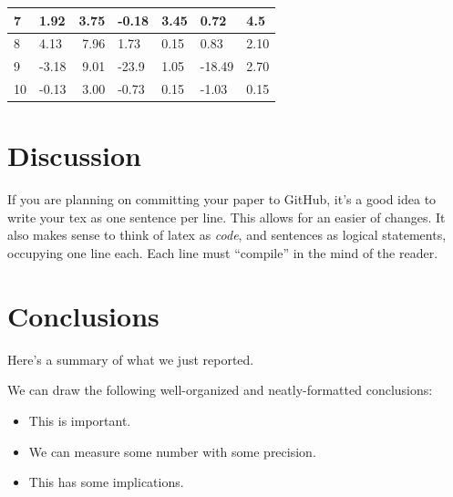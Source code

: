 \documentclass[\docopts]{\docclass}
\begin{document}
\begin{table}[]
\begin{tabular}{|l|l|r|l|l|l|l|}
7                                           & 1.92                   & 3.75                                                 & -0.18                   & 3.45                            & 0.72                    & 4.5                             \\ \hline
8                                           & 4.13                   & 7.96                                                 & 1.73                    & 0.15                            & 0.83                    & 2.10                            \\ \hline
9                                           & -3.18                  & 9.01                                                 & -23.9                   & 1.05                            & -18.49                  & 2.70                            \\ \hline
10                                          & -0.13                  & 3.00                                                 & -0.73                   & 0.15                            & -1.03                   & 0.15                            \\ \hline
\end{tabular}
\end{table}

\section{Discussion}
\label{sec:discussion}

If you are planning on committing your paper to GitHub, it's a good idea to write your tex as one sentence per line.
This allows for an easier  of changes.
It also makes sense to think of latex as \emph{code}, and sentences as logical statements, occupying one line each.
Each line must ``compile'' in the mind of the reader.



\section{Conclusions}
\label{sec:conclusions}

Here's a summary of what we just reported.

We can draw the following well-organized and neatly-formatted conclusions:
\begin{itemize}
  \item This is important.
  \item We can measure some number with some precision.
  \item This has some implications.
\end{itemize}
\end{document}
